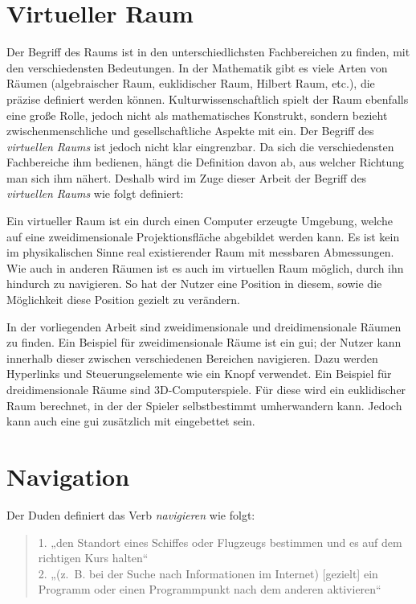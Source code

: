 \section{Virtueller Raum}
Der Begriff des Raums ist in den unterschiedlichsten Fachbereichen zu finden, mit den verschiedensten Bedeutungen.
In der Mathematik gibt es viele Arten von Räumen (algebraischer Raum, euklidischer Raum, Hilbert Raum, etc.), die präzise definiert werden können.
Kulturwissenschaftlich spielt der Raum ebenfalls eine große Rolle, jedoch nicht als mathematisches Konstrukt, sondern bezieht zwischenmenschliche und gesellschaftliche Aspekte mit ein.
Der Begriff des \textit{virtuellen Raums} ist jedoch nicht klar eingrenzbar.
Da sich die verschiedensten Fachbereiche ihm bedienen, hängt die Definition davon ab, aus welcher Richtung man sich ihm nähert.
Deshalb wird im Zuge dieser Arbeit der Begriff des \textit{virtuellen Raums} wie folgt definiert:

Ein virtueller Raum ist ein durch einen Computer erzeugte Umgebung, welche auf eine zweidimensionale Projektionsfläche abgebildet werden kann.
Es ist kein im physikalischen Sinne real existierender Raum mit messbaren Abmessungen.
Wie auch in anderen Räumen ist es auch im virtuellen Raum möglich, durch ihn hindurch zu navigieren.
So hat der Nutzer eine Position in diesem, sowie die Möglichkeit diese Position gezielt zu verändern.

In der vorliegenden Arbeit sind zweidimensionale und dreidimensionale Räumen zu finden.
Ein Beispiel für zweidimensionale Räume ist ein \ac{gui}; der Nutzer kann innerhalb dieser zwischen verschiedenen Bereichen navigieren.
Dazu werden Hyperlinks und Steuerungselemente wie ein Knopf verwendet.
Ein Beispiel für dreidimensionale Räume sind 3D-Computerspiele.
Für diese wird ein euklidischer Raum berechnet, in der der Spieler selbstbestimmt umherwandern kann.
Jedoch kann auch eine \ac{gui} zusätzlich mit eingebettet sein.

\section{Navigation}
Der Duden definiert das Verb \textit{navigieren} wie folgt:

\begin{quote}
    1. „den Standort eines Schiffes oder Flugzeugs bestimmen und es auf dem richtigen Kurs halten“\\
    2. „(z. B. bei der Suche nach Informationen im Internet) [gezielt] ein Programm oder einen Programmpunkt nach dem anderen aktivieren“
    \cite{DudenNavigierenRechtschreibung}
\end{quote}

